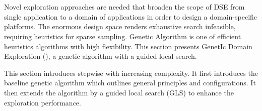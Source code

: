 \section{\ga}
\label{sec:GA}

Novel exploration approaches are needed that broaden the scope of DSE from single application to a domain of applications in order to design a domain-specific platforms. The enormous design space renders exhaustive search infeasible, requiring heuristics for sparse sampling. Genetic Algorithm is one of efficient heuristics algorithms with high flexibility. This section presents GenetIc Domain Exploration (\ga), a genetic algorithm with a guided local search.


\iffalse
Using the domain formalization in \secref{sec:Domain}, \ga addresses the problem as follows: 
\begin{problem}[DS-DSE]
	\label{p:dse}
	\normalfont{Given a domain \textit{G} and a HW budget $N$ (area), find a HW/SW partition of \textit{T} (the set of domain function types) that maximizes average throughput improvement \footnote{In DSE problem, there are multiple objectives, e.g. throughput, delay, power consumption, and area. To simplify problem and clarify result discussion, this paper only focuses on one objective throughput with the fixed area limitation (area). Multiple-objective DS-DSE problems will be in the future work.} over pure SW execution for all $\textit{g} \in \textit{G}$.}
\end{problem}
\fi


This section introduces \ga stepwise with increasing complexity. It first introduces the baseline genetic algorithm \emph{\garand} which outlines general principles and configurations. It then extends the algorithm by a guided local search (GLS) to enhance the exploration performance. 












